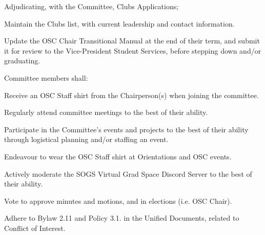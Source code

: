 \begin{longenum}[ label*=\thesubsection.\arabic*., align=left]
\begin{longenum}[label*=\arabic*., align=left]
\begin{longenum}[label*=\arabic*., align=left]
\begin{longenum}[label*=\arabic*., align=left]
				\item Adjudicating, with the Committee, Clubs Applications; 
				\item Maintain the Clubs list, with current leadership and contact information.				
				\end{longenum}					
			\item Update the OSC Chair Transitional Manual at the end of their term, and submit it for review to the Vice-President Student Services, before stepping down and/or graduating.						
			\end{longenum}	
		\item Committee members shall:
			\begin{longenum}[label*=\arabic*., align=left]
			\item Receive an OSC Staff shirt from the Chairperson(s) when joining the committee.
			\item Regularly attend committee meetings to the best of their ability.
			\item Participate in the Committee's events and projects to the best of their ability through logistical planning and/or staffing an event.
			\item Endeavour to wear the OSC Staff shirt at Orientations and OSC events.
			\item Actively moderate the SOGS Virtual Grad Space Discord Server to the best of their ability.
			\item Vote to approve minutes and motions, and in elections (i.e. OSC Chair).			 			
			\item Adhere to Bylaw 2.11 and Policy 3.1. in the Unified Documents, related to Conflict of Interest.
			\end{longenum}	
		\end{longenum}
\end{longenum}
	
